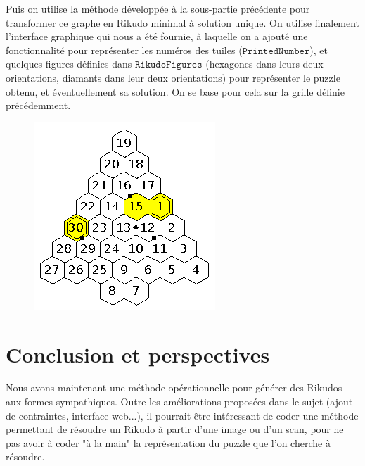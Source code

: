 \documentclass[11pt, a4paper]{article}
\begin{document}
Puis on utilise la méthode développée à la sous-partie précédente pour transformer ce graphe en Rikudo minimal à solution unique. On utilise finalement l'interface graphique qui nous a été fournie, à laquelle on a ajouté une fonctionnalité pour représenter les numéros des tuiles ($\mathtt{PrintedNumber}$), et quelques figures définies dans $\mathtt{RikudoFigures}$ (hexagones dans leurs deux orientations, diamants dans leur deux orientations) pour représenter le puzzle obtenu, et éventuellement sa solution. On se base pour cela sur la grille définie précédemment.

\begin{figure}[h]
	\centering
	\includegraphics{ChristmasTree.png}
\end{figure}


\section*{Conclusion et perspectives}

Nous avons maintenant une méthode opérationnelle pour générer des Rikudos aux formes sympathiques. Outre les améliorations proposées dans le sujet (ajout de contraintes, interface web...), il pourrait être intéressant de coder une méthode permettant de résoudre un Rikudo à partir d'une image ou d'un scan, pour ne pas avoir à coder "à la main" la représentation du puzzle que l'on cherche à résoudre.
	
\end{document}
